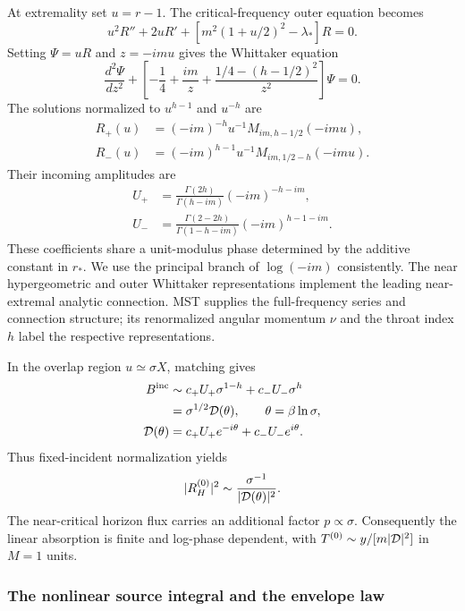 \documentclass[aps,prd,twocolumn,10pt,nofootinbib,superscriptaddress,floatfix]{revtex4-2}
\begin{document}
At extremality set $u=r-1$.  The critical-frequency outer equation becomes
\begin{equation}
u^2R''+2uR'+[m^2(1+u/2)^2-\lambda_*]R=0.
\label{eq:principal-outer-ode}
\end{equation}
Setting $\Psi=uR$ and $z=-imu$ gives the Whittaker equation
\begin{equation}
\frac{d^2\Psi}{dz^2}
+\left[-\frac14+\frac{im}{z}+
\frac{1/4-(h-1/2)^2}{z^2}\right]\Psi=0.
\end{equation}
The solutions normalized to $u^{h-1}$ and $u^{-h}$ are
\begin{align}
R_+(u)&=(-im)^{-h}u^{-1}M_{im,h-1/2}(-imu),\nonumber\\
R_-(u)&=(-im)^{h-1}u^{-1}M_{im,1/2-h}(-imu).
\end{align}
Their incoming amplitudes are
\begin{align}
U_+&=\frac{\Gamma(2h)}{\Gamma(h-im)}(-im)^{-h-im},\nonumber\\
U_-&=\frac{\Gamma(2-2h)}{\Gamma(1-h-im)}(-im)^{h-1-im}.
\label{eq:principal-outer-connection}
\end{align}
These coefficients share a unit-modulus phase determined by the additive
constant in $r_*$.  We use the principal branch of $\log(-im)$ consistently.
The near hypergeometric and outer Whittaker representations implement the
leading near-extremal analytic connection.  MST supplies the full-frequency
series and connection structure\cite{MST1996}; its renormalized angular
momentum $\nu$ and the throat index $h$ label the respective representations.

In the overlap region $u\simeq\sigma X$, matching gives
\begin{align}
B^{\rm inc}&\sim c_+U_+\sigma^{1-h}+c_-U_-\sigma^h\nonumber\\
&=\sigma^{1/2}{\cal D}(\theta),\qquad\theta=\beta\ln\sigma,\nonumber\\
{\cal D}(\theta)&=c_+U_+e^{-i\theta}+c_-U_-e^{i\theta}.
\label{eq:principal-incidence}
\end{align}
Thus fixed-incident normalization yields
\begin{equation}
|R_H^{(0)}|^2\sim\frac{\sigma^{-1}}{|{\cal D}(\theta)|^2}.
\label{eq:principal-density}
\end{equation}
The near-critical horizon flux carries an additional factor $p\propto\sigma$.
Consequently the linear absorption is finite and log-phase dependent, with
$T^{(0)}\sim y/[m|{\cal D}|^2]$ in $M=1$ units.

\subsubsection{The nonlinear source integral and the envelope law}
\end{document}
